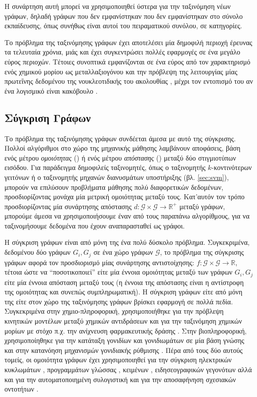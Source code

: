 Η συνάρτηση αυτή μπορεί να χρησιμοποιηθεί ύστερα για την ταξινόμηση νέων γράφων, δηλαδή γράφων που δεν εμφανίστηκαν που δεν εμφανίστηκαν στο σύνολο εκπαίδευσης, όπως συνήθως είναι αυτοί του πειραματικού συνόλου, σε κατηγορίες.\par
Το πρόβλημα της ταξινόμησης γράφων έχει αποτελέσει μία δημοφιλή περιοχή έρευνας τα τελευταία χρόνια, μιάς και έχει συγκεντρώσει πολλές εφαρμογές σε ένα μεγάλο εύρος περιοχών.
Τέτοιες συνοπτικά εμφανίζονται σε ένα εύρος από τον χαρακτηρισμό ενός χημικού μορίου ως μεταλλαξιογόνου \cite{Swamidass2005} και την πρόβλεψη της λειτουργίας μίας πρωτεΐνης δεδομένου της νουκλεοτιδικής του ακολουθίας \cite{Borgwardt2005}, μέχρι τον εντοπισμό του αν ένα λογισμικό είναι κακόβουλο \cite{Wagner2009}.
\subsection{Σύγκριση Γράφων}
Το πρόβλημα της ταξινόμησης γράφων συνδέεται άμεσα με αυτό της σύγκρισης.
Πολλοί αλγόριθμοι στο χώρο της μηχανικής μάθησης λαμβάνουν αποφάσεις, βάση ενός μέτρου \textit{ομοιότητας} () ή ενός μέτρου \textit{απόστασης} () μεταξύ δύο στιγμιοτύπων εισόδου.
Για παράδειγμα δημοφιλείς ταξινομητές, όπως ο ταξινομητής $k$-κοντινότερων γειτόνων ή ο ταξινομητής μηχανών διανυσμάτων υποστήριξης (βλ. \ref{sec:svm}), μπορούν να επιλύσουν προβλήματα μάθησης πολύ διαφορετικών δεδομένων, προσδιορίζοντας μονάχα μία μετρική ομοιότητας μεταξύ τους.
Κατ'αυτόν τον τρόπο προσδιορίζοντας μία συνάρτησης απόστασης $d : \mathcal{G} \times \mathcal{G} \rightarrow \mathbb{R}^{+}$ μεταξύ γράφων, μπορούμε άμεσα να χρησιμοποιήσουμε έναν από τους παραπάνω αλγορίθμους, για να ταξινομήσουμε δεδομένα που έχουν αναπαρασταθεί ως γράφοι.\par
Η σύγκριση γράφων είναι από μόνη της ένα πολύ δύσκολο πρόβλημα.
Συγκεκριμένα, δεδομένου δύο γράφων $G_{i}, G_{j}$ σε ένα χώρο γράφων $\mathcal{G}$, το πρόβλημα της σύγκρισης γράφων αφορά τον προσδιορισμό μίας συνάρτησης αντιστοίχησης: $f: \mathcal{G} \times \mathcal{G} \rightarrow \mathbb{R}$, τέτοια ώστε να ``ποσοτικοποιεί'' είτε μία έννοια ομοιότητας μεταξύ των γράφων $G_{i}, G_{j}$ είτε μία έννοια απόσταση μεταξύ τους (η έννοια της απόστασης είναι η αντίστροφη της ομοιότητας και συνεπώς συμπληρωματική).
Η σύγκριση γράφων είτε από μόνη της είτε στον χώρο της ταξινόμησης γράφων βρίσκει εφαρμογή σε πολλά πεδία.
Συγκεκριμένα στην χημιο-πληροφορική, χρησιμοποιήθηκε για την πρόβλεψη κινητικών μοντέλων μεταξύ χημικών αντιδράσεων \cite{Genesys} και για την ταξινόμηση χημικών μορίων με στόχο π.χ. την ανίχνευση φαρμακευτικής δράσης \cite{Wale2008}.
Στην βιοπληροφορική, χρησιμοποίηθηκε για την κατάταξη γονιδίων και γονιδιωμάτων σε μία βάση γνώσης\cite{KEGG, Hattori2003} και στην κατανόηση μηχανισμών γονιδιακής ρύθμισης \cite{Davidson1669}.
Πέρα από τους δύο αυτούς τομείς, οι ομοιότητα γράφων έχει χρησιμοποιηθεί για την σύγκριση ηλεκτρικών κυκλωμάτων \cite{Takashima1988}, προγραμμάτων γλώσσας  \cite{Gitchell1999}, κειμένων \cite{Rousseau2015TextCA}, ειδησεογραφικών γεγονότων \cite{Glavas2013} αλλά και για την αυτοματοποιημένη συλογιστική \cite{Tsivtsivadze2011} και για την αποσαφήνηση σχεσιακών οντοτήτων \cite{Hermansson2013EntityDI}.
